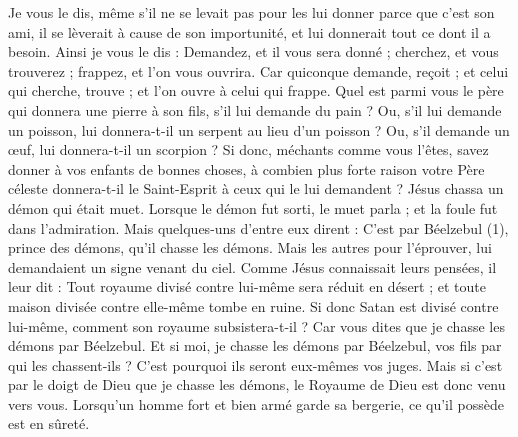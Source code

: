 \begin{multicols}{2}
{Je vous le dis, même s’il ne se levait pas pour les lui donner parce que c’est son ami, il se lèverait à cause de son importunité, et lui donnerait tout ce dont il a besoin.
Ainsi je vous le dis : Demandez, et il vous sera donné ; cherchez, et vous trouverez ; frappez, et l’on vous ouvrira.
Car quiconque demande, reçoit ; et celui qui cherche, trouve ; et l’on ouvre à celui qui frappe.
Quel est parmi vous le père qui donnera une pierre à son fils, s’il lui demande du pain ? Ou, s’il lui demande un poisson, lui donnera-t-il un serpent au lieu d’un poisson ?
Ou, s'il demande un œuf, lui donnera-t-il un scorpion ?
Si donc, méchants comme vous l’êtes, savez donner à vos enfants de bonnes choses, à combien plus forte raison votre Père céleste donnera-t-il le Saint-Esprit à ceux qui le lui demandent ?
Jésus chassa un démon qui était muet. Lorsque le démon fut sorti, le muet parla ; et la foule fut dans l’admiration.
\TextTitle{[grandeur]}
Mais quelques-uns d'entre eux dirent : C’est par Béelzebul (1), prince des démons, qu'il chasse les démons.
Mais les autres pour l'éprouver, lui demandaient un signe venant du ciel.
Comme Jésus connaissait leurs pensées, il leur dit : Tout royaume divisé contre lui-même sera réduit en désert ; et toute maison divisée contre elle-même tombe en ruine.
Si donc Satan est divisé contre lui-même, comment son royaume subsistera-t-il ? Car vous dites que je chasse les démons par Béelzebul.
Et si moi, je chasse les démons par Béelzebul, vos fils par qui les chassent-ils ? C’est pourquoi ils seront eux-mêmes vos juges.
Mais si c’est par le doigt de Dieu que je chasse les démons, le Royaume de Dieu est donc venu vers vous.
Lorsqu’un homme fort et bien armé garde sa bergerie, ce qu’il possède est en sûreté.
}
\end{multicols}
